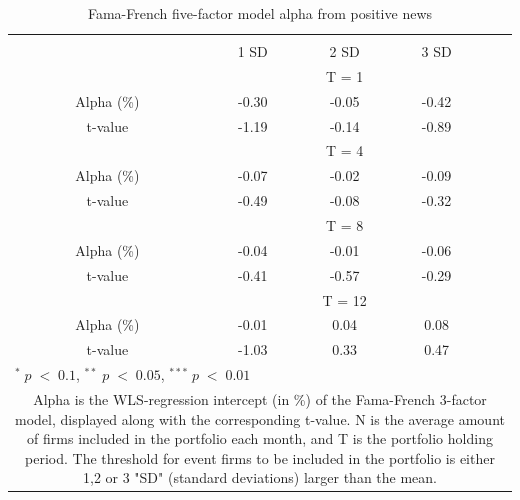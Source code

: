 \setlength{\tabcolsep}{15pt}
\begin{table}[]
\small
\centering
\caption{Fama-French five-factor model alpha from positive news } 
\begin{tabular}{ccccccc}
\hline \hline \\ 
 &     &  &    1 SD  &  2 SD  &  3 SD  &  \\ \cline{4-6} 
& & & \multicolumn{3}{c}{ T = 1} & \\ \cline{2-6}
& Alpha (\%)  &  & -0.30  & -0.05  & -0.42 &  \\
& t-value &  & -1.19 & -0.14  & -0.89 & \\
& & & \multicolumn{3}{c}{ T = 4} & \\ \cline{2-6}
& Alpha (\%)  &  & -0.07  & -0.02  &  -0.09 & \\
& t-value &  & -0.49 & -0.08  & -0.32 & \\
& & & \multicolumn{3}{c}{ T = 8} & \\ \cline{2-6}
& Alpha (\%)  &  & -0.04   & -0.01  & -0.06 &  \\
& t-value &  & -0.41  & -0.57 & -0.29 & \\
&  & & \multicolumn{3}{c}{ T = 12} & \\ \cline{2-6}
& Alpha (\%)  &  & -0.01  & 0.04  & 0.08 &  \\
& t-value &  & -1.03  & 0.33 & 0.47 & \\
\hline \hline
 \multicolumn{7}{l}{ \footnotesize $^* \; p\; <\; 0.1$, $ ^{**} \; p\; <\; 0.05$, $ ^{***} \; p\; <\; 0.01$  } \\
 \multicolumn{7}{p{11.5cm}}{ \footnotesize Alpha is the WLS-regression intercept (in \%) of the Fama-French 3-factor model, displayed along with the corresponding t-value. N is the average amount of firms included in the portfolio each month, and T is the portfolio holding period. The threshold for event firms to be included in the portfolio is either 1,2 or 3 "SD" (standard deviations) larger than the mean.}  \\ 
\end{tabular}
\label{tab: FF3-pos}
\end{table}